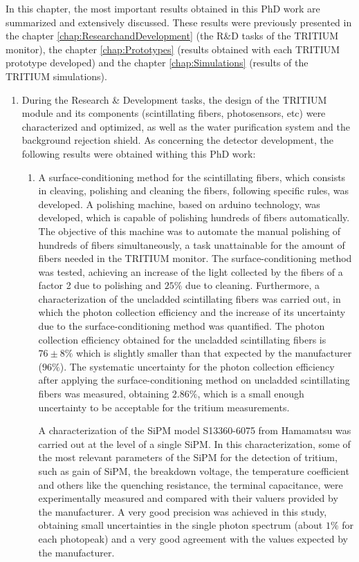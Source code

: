 In this chapter, the most important results obtained in this PhD work are summarized and extensively discussed. These results were previously presented in the chapter \ref{chap:ResearchandDevelopment} (the R\&D tasks of the TRITIUM monitor), the chapter \ref{chap:Prototypes} (results obtained with each TRITIUM prototype developed) and the chapter \ref{chap:Simulations} (results of the TRITIUM simulations).


\begin{enumerate}
\item{} During the Research \& Development tasks, the design of the TRITIUM module and its components (scintillating fibers, photosensors, etc) were characterized and optimized, as well as the water purification system and the background rejection shield. As concerning the detector development, the following results were obtained withing this PhD work:

\begin{enumerate}
\item{} A surface-conditioning method for the scintillating fibers, which consists in cleaving, polishing and cleaning the fibers, following specific rules, was developed. A polishing machine, based on arduino technology, was developed, which is capable of polishing hundreds of fibers automatically. The objective of this machine was to automate the manual polishing of hundreds of fibers simultaneously, a task unattainable for the amount of fibers needed in the TRITIUM monitor. The surface-conditioning method was tested, achieving an increase of the light collected by the fibers of a factor 2 due to polishing and $25\%$ due to cleaning. Furthermore, a characterization of the uncladded scintillating fibers was carried out, in which the photon collection efficiency and the increase of its uncertainty due to the surface-conditioning method was quantified. The photon collection efficiency obtained for the uncladded scintillating fibers is $76\pm 8\%$ which is slightly smaller than that expected by the manufacturer ($96\%$). The systematic uncertainty for the photon collection efficiency after applying the surface-conditioning method on uncladded scintillating fibers was measured, obtaining $2.86\%$, which is a small enough uncertainty to be acceptable for the tritium measurements.

A characterization of the SiPM model S13360-6075 from Hamamatsu was carried out at the level of a single SiPM. In this characterization, some of the most relevant parameters of the SiPM for the detection of tritium, such as gain of SiPM, the breakdown voltage, the temperature coefficient and others like the quenching resistance, the terminal capacitance, were experimentally measured and compared with their valuers provided by the manufacturer. A very good precision was achieved in this study, obtaining small uncertainties in the single photon spectrum (about $1\%$ for each photopeak) and a very good agreement with the values expected by the manufacturer.


\end{enumerate}
\end{enumerate}

